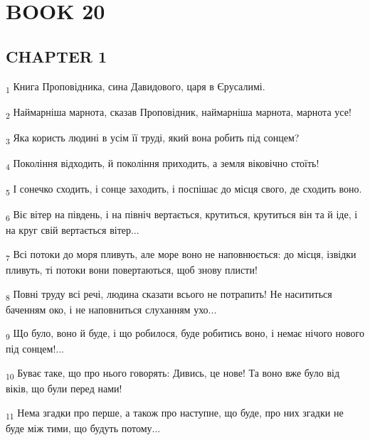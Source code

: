 \section{BOOK 20}
\subsection{CHAPTER 1}
\begin{tcolorbox}
\textsubscript{1} Книга Проповідника, сина Давидового, царя в Єрусалимі.
\end{tcolorbox}
\begin{tcolorbox}
\textsubscript{2} Наймарніша марнота, сказав Проповідник, наймарніша марнота, марнота усе!
\end{tcolorbox}
\begin{tcolorbox}
\textsubscript{3} Яка користь людині в усім її труді, який вона робить під сонцем?
\end{tcolorbox}
\begin{tcolorbox}
\textsubscript{4} Покоління відходить, й покоління приходить, а земля віковічно стоїть!
\end{tcolorbox}
\begin{tcolorbox}
\textsubscript{5} І сонечко сходить, і сонце заходить, і поспішає до місця свого, де сходить воно.
\end{tcolorbox}
\begin{tcolorbox}
\textsubscript{6} Віє вітер на південь, і на північ вертається, крутиться, крутиться він та й іде, і на круг свій вертається вітер...
\end{tcolorbox}
\begin{tcolorbox}
\textsubscript{7} Всі потоки до моря пливуть, але море воно не наповнюється: до місця, ізвідки пливуть, ті потоки вони повертаються, щоб знову плисти!
\end{tcolorbox}
\begin{tcolorbox}
\textsubscript{8} Повні труду всі речі, людина сказати всього не потрапить! Не насититься баченням око, і не наповниться слуханням ухо...
\end{tcolorbox}
\begin{tcolorbox}
\textsubscript{9} Що було, воно й буде, і що робилося, буде робитись воно, і немає нічого нового під сонцем!...
\end{tcolorbox}
\begin{tcolorbox}
\textsubscript{10} Буває таке, що про нього говорять: Дивись, це нове! Та воно вже було від віків, що були перед нами!
\end{tcolorbox}
\begin{tcolorbox}
\textsubscript{11} Нема згадки про перше, а також про наступне, що буде, про них згадки не буде між тими, що будуть потому...
\end{tcolorbox}
